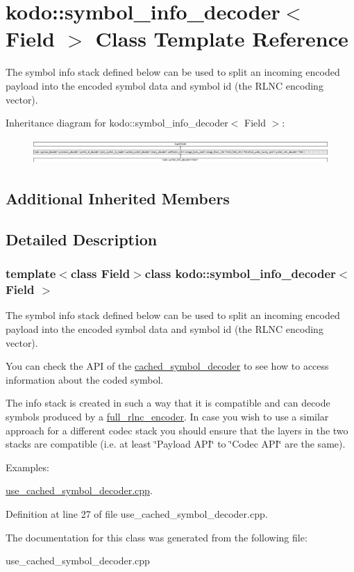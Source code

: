 \hypertarget{classkodo_1_1symbol__info__decoder}{\section{kodo\-:\-:symbol\-\_\-info\-\_\-decoder$<$ Field $>$ Class Template Reference}
\label{classkodo_1_1symbol__info__decoder}
}


The symbol info stack defined below can be used to split an incoming encoded payload into the encoded symbol data and symbol id (the R\-L\-N\-C encoding vector).  


Inheritance diagram for kodo\-:\-:symbol\-\_\-info\-\_\-decoder$<$ Field $>$\-:\begin{figure}[H]
\begin{center}
\leavevmode
\includegraphics[height=0.964409cm]{classkodo_1_1symbol__info__decoder}
\end{center}
\end{figure}
\subsection*{Additional Inherited Members}


\subsection{Detailed Description}
\subsubsection*{template$<$class Field$>$class kodo\-::symbol\-\_\-info\-\_\-decoder$<$ Field $>$}

The symbol info stack defined below can be used to split an incoming encoded payload into the encoded symbol data and symbol id (the R\-L\-N\-C encoding vector). 

You can check the A\-P\-I of the \hyperlink{classkodo_1_1cached__symbol__decoder}{cached\-\_\-symbol\-\_\-decoder} to see how to access information about the coded symbol.

The info stack is created in such a way that it is compatible and can decode symbols produced by a \hyperlink{classkodo_1_1full__rlnc__encoder}{full\-\_\-rlnc\-\_\-encoder}. In case you wish to use a similar approach for a different codec stack you should ensure that the layers in the two stacks are compatible (i.\-e. at least \char`\"{}\-Payload
       A\-P\-I\char`\"{} to \char`\"{}\-Codec A\-P\-I\char`\"{} are the same). \begin{Desc}
\item[Examples\-: ]\par
\hyperlink{use_cached_symbol_decoder_8cpp-example}{use\-\_\-cached\-\_\-symbol\-\_\-decoder.\-cpp}.\end{Desc}


Definition at line 27 of file use\-\_\-cached\-\_\-symbol\-\_\-decoder.\-cpp.



The documentation for this class was generated from the following file\-:\begin{DoxyCompactItemize}
\item 
use\-\_\-cached\-\_\-symbol\-\_\-decoder.\-cpp\end{DoxyCompactItemize}

